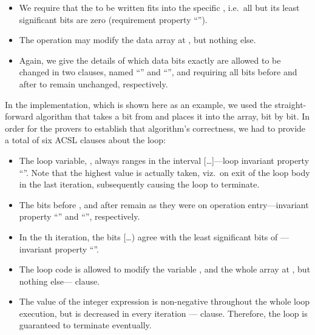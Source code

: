 \FloatBarrier

\begin{itemize}
\item We require that the  to be written fits into
the specific
	, i.e.\ all but its 
	least significant bits are
	zero (requirement property ``'').
\item The operation may modify the data array at ,
but nothing else.
\item Again, we give the details of which data bits exactly
	are allowed to be changed in two
	 clauses, named ``'' and
	``'', and requiring all bits before
	 and after
	 to remain unchanged, respectively.
\end{itemize}

In the implementation, which is shown here as an example, we used
the straight-forward
algorithm that takes a bit from  and places it into
the  array, bit by bit.
%
In order for the provers to establish that algorithm's correctness,
we had to provide a total of six ACSL clauses about the loop:
%
\begin{itemize}
\item The loop variable, , always ranges in the interval
	[\ldots{}]---loop invariant property ``''.
	Note that the highest value is actually taken,
	viz.\ on exit of the loop body in the last iteration,
	subsequently causing the loop to terminate.
\item The bits before , and after
	remain as they were on operation entry---invariant property
	``'' and ``'', respectively.
\item In the th iteration, the bits
	[\ldots{}) agree with
	the least significant
	 bits of ---invariant property
	``''.
\item The loop code is allowed to modify the variable ,
	and the whole array
	at , but nothing else---
	 clause.
\item The value of the integer
	expression  is non-negative throughout
	the whole loop execution, but is decreased in every iteration 
	---  clause.
	Therefore, the loop is guaranteed to terminate eventually.
\end{itemize}




